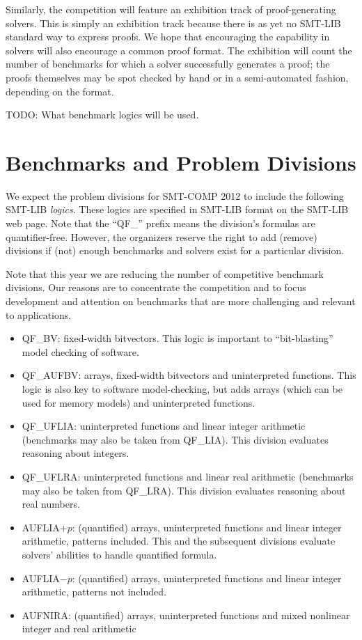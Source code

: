 \documentclass[12pt]{article}
\begin{document}
Similarly, the competition will feature an exhibition track of proof-generating solvers. This is
simply an exhibition track because there is as yet no SMT-LIB standard way to express proofs. We hope
that encouraging the capability in solvers will also encourage a common proof format. The exhibition
will count the number of benchmarks for which a solver successfully generates a proof; the proofs 
themselves may be spot checked by hand or in a semi-automated fashion, depending on the format.

TODO: What benchmark logics will be used. 


\section{Benchmarks and Problem Divisions}
\label{sec:theories}


We expect the problem divisions for SMT-COMP 2012 to include the following
SMT-LIB \emph{logics}.  These logics are specified in SMT-LIB format on the
SMT-LIB web page.  Note that the ``QF\_'' prefix means the division's
formulas are quantifier-free.  However, the organizers reserve the right to add
(remove) divisions if (not) enough benchmarks and solvers exist for a
particular division.

Note that this year we are reducing the number of competitive benchmark divisions.
Our reasons are to concentrate the competition and to focus development and attention
on benchmarks that are more challenging and relevant to applications.

\begin{itemize}

\item QF\_BV: fixed-width bitvectors. This logic is important to ``bit-blasting'' model checking of software.
\item QF\_AUFBV: arrays, fixed-width bitvectors and uninterpreted
functions. This logic is also key to software model-checking, but adds arrays (which can be used for memory models) and uninterpreted functions.

\item QF\_UFLIA: uninterpreted functions and linear integer arithmetic (benchmarks may also be taken from  QF\_LIA). This division evaluates reasoning about integers.
\item QF\_UFLRA: uninterpreted functions and linear real arithmetic (benchmarks may also be taken from  QF\_LRA). This division evaluates reasoning about real numbers.

\item AUFLIA$+p$: (quantified) arrays, uninterpreted functions and 
linear integer arithmetic, patterns included. This and the subsequent divisions evaluate solvers' abilities to handle quantified formula.
\item AUFLIA$-p$: (quantified) arrays, uninterpreted functions and 
linear integer arithmetic, patterns not included.
\item AUFNIRA: (quantified) arrays, uninterpreted functions and 
mixed nonlinear integer and real arithmetic

\end{itemize}
\end{document}
